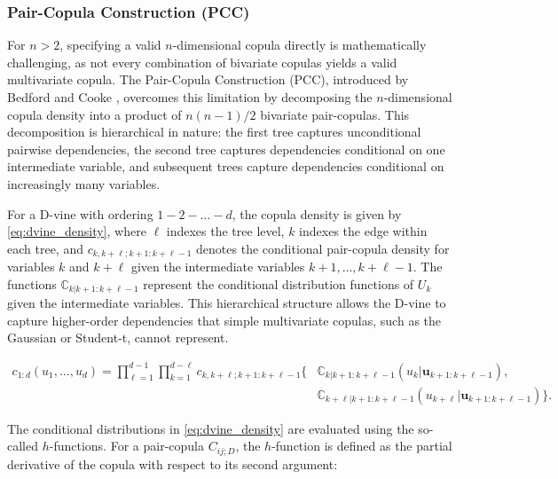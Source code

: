 \subsubsection{Pair-Copula Construction (PCC)}
\label{subsubsec:3_pair_copula_construction}

For \( n > 2 \), specifying a valid \( n \)-dimensional copula directly is mathematically challenging, as not every combination of bivariate copulas yields a valid multivariate copula. The Pair-Copula Construction (PCC), introduced by Bedford and Cooke \cite{bedford_probability_2001,bedford_vinesnew_2002}, overcomes this limitation by decomposing the \( n \)-dimensional copula density into a product of \( n(n-1)/2 \) bivariate pair-copulas. This decomposition is hierarchical in nature: the first tree captures unconditional pairwise dependencies, the second tree captures dependencies conditional on one intermediate variable, and subsequent trees capture dependencies conditional on increasingly many variables.

For a D-vine with ordering \( 1-2-\dots-d \), the copula density is given by \eqref{eq:dvine_density}, where \( \ell \) indexes the tree level, \( k \) indexes the edge within each tree, and \( c_{k,k+\ell;k+1:k+\ell-1} \) denotes the conditional pair-copula density for variables \( k \) and \( k+\ell \) given the intermediate variables \( k+1, \dots, k+\ell-1 \). The functions \( \mathbb{C}_{k|k+1:k+\ell-1} \) represent the conditional distribution functions of \( U_k \) given the intermediate variables. This hierarchical structure allows the D-vine to capture higher-order dependencies that simple multivariate copulas, such as the Gaussian or Student-t, cannot represent.

\begin{equation}
\begin{aligned}
c_{1:d}(u_1, \dots, u_d) = \prod_{\ell=1}^{d-1} \prod_{k=1}^{d-\ell} c_{k,k+\ell;k+1:k+\ell-1}\{ &\mathbb{C}_{k|k+1:k+\ell-1}(u_k | \boldsymbol{u}_{k+1:k+\ell-1}), \\ &\mathbb{C}_{k+\ell|k+1:k+\ell-1}(u_{k+\ell} | \boldsymbol{u}_{k+1:k+\ell-1}) \}.
\label{eq:dvine_density}
\end{aligned}
\end{equation}

The conditional distributions in \eqref{eq:dvine_density} are evaluated using the so-called \( h \)-functions. For a pair-copula \( C_{ij;D} \), the \( h \)-function is defined as the partial derivative of the copula with respect to its second argument:

